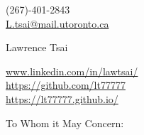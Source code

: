 \documentclass[11pt,a4]{article}
\begin{document}
\begin{center}
    \begin{minipage}[b]{0.24\textwidth}
            \large (267)-401-2843 \\
            \large \href{mailto:L.tsai@mail.utoronto.ca}{L.tsai@mail.utoronto.ca} 
    \end{minipage}%
    \begin{minipage}[b]{0.5\textwidth}
            \centering
            {\Huge Lawrence Tsai} \\ %
            \vspace{0.1cm}
            {\color{UI_blue} \Large{}}
    \end{minipage}%
    \begin{minipage}[b]{0.33\textwidth}
            \flushright \large
            {\href{www.linkedin.com/in/lawtsai/}{www.linkedin.com/in/lawtsai/} } \\
            \href{https://github.com/lt77777}{https://github.com/lt77777} \\
            \href{https://lt77777.github.io/}
            {https://lt77777.github.io/}
    \end{minipage}   
    
\vspace{-0.15cm} 
{\color{UI_blue} \hrulefill}
\end{center}

\justify
\setlength{\parindent}{0pt}
\setlength{\parskip}{12pt}
\vspace{0.2cm}




To Whom it May Concern:
\end{document}
